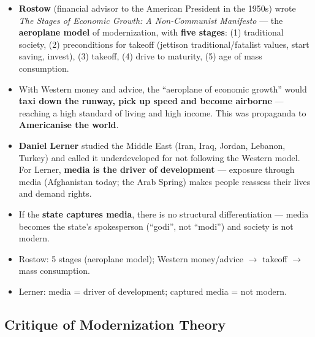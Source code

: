 \begin{KeyConcept}
\begin{itemize}
    \item \textbf{Rostow} (financial advisor to the American President in the 1950s) wrote \textit{The Stages of Economic Growth: A Non-Communist Manifesto} --- the \textbf{aeroplane model} of modernization, with \textbf{five stages}: (1) traditional society, (2) preconditions for takeoff (jettison traditional/fatalist values, start saving, invest), (3) takeoff, (4) drive to maturity, (5) age of mass consumption.
    \item With Western money and advice, the ``aeroplane of economic growth'' would \textbf{taxi down the runway, pick up speed and become airborne} --- reaching a high standard of living and high income. This was propaganda to \textbf{Americanise the world}.
\end{itemize}
\end{KeyConcept}

\begin{KeyConcept}
\begin{itemize}
    \item \textbf{Daniel Lerner} studied the Middle East (Iran, Iraq, Jordan, Lebanon, Turkey) and called it underdeveloped for not following the Western model. For Lerner, \textbf{media is the driver of development} --- exposure through media (Afghanistan today; the Arab Spring) makes people reassess their lives and demand rights.
    \item If the \textbf{state captures media}, there is no structural differentiation --- media becomes the state's spokesperson (``godi'', not ``modi'') and society is not modern.
\end{itemize}
\end{KeyConcept}

\begin{QuickRevision}
\begin{itemize}
    \item Rostow: 5 stages (aeroplane model); Western money/advice $\rightarrow$ takeoff $\rightarrow$ mass consumption.
    \item Lerner: media = driver of development; captured media = not modern.
\end{itemize}
\end{QuickRevision}

\sectiondivider

\subsection{Critique of Modernization Theory}

